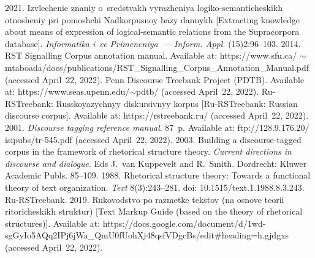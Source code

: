   \begin{multicols}{2}

\renewcommand{\bibname}{\protect\rmfamily References}

{\small\frenchspacing
 {\baselineskip=10.6pt
 

 \begin{thebibliography}{99}
 
  \vspace*{-2pt}
  
 2021. Izvlechenie znaniy o~sredstvakh 
vyrazheniya logiko-semanticheskikh otnosheniy pri pomoshchi Nadkorpusnoy bazy 
dannykh [Extracting knowledge about means of expression of logical-semantic relations 
from the Supracorpora database]. \textit{Informatika i~ee Primeneniya~--- Inform. 
Appl.} (15)2:96--103.
 2014. RST Signalling Corpus annotation manual. 
Available at: {\sf https://www.sfu.ca/ $\sim$mtaboada/docs/publications/RST\_Signalling\_\linebreak Corpus\_Annotation\_Manual.pdf} 
(accessed April~22, 2022).
Penn Discourse Treebank Project (PDTB). Available at: {\sf  
https://www.seas.upenn.edu/$\sim$pdtb/} (accessed April~22, 2022).
Ru-RSTreebank: Russkoyazychnyy diskursivnyy korpus [Ru-RSTreebank: Russian 
discourse corpus]. Available at: {\sf https://rstreebank.ru/} (accessed April~22, 2022).
 2001. \textit{Discourse tagging reference manual}. 
87~p. Available at: {\sf ftp://128.9.176.20/ isipubs/tr-545.pdf} (accessed April~22, 
2022).
 2003. Building a discourse-tagged 
corpus in the framework of rhetorical structure theory. \textit{Current directions in 
discourse and dialogue}. Eds J.~van Kuppevelt and R.~Smith. Dordrecht: Kluwer 
Academic Publs. 85--109.
 1988. Rhetorical structure theory: Towards 
a functional theory of text organization. \textit{Text} 8(3):243--281. doi: 10.1515/text.1.1988.8.3.243.
Ru-RSTreebank. 2019.
Rukovodstvo po razmetke tekstov (na osnove teorii ritoricheskikh struktur) [Text 
Markup Guide (based on the theory of rhetorical structures)]. Available at: {\sf 
https://docs.google.com/\linebreak document/d/1wd-sgGyIo5AQq2IPj6jWa\_QmU0fUohXj\linebreak 48qsfVDgcBs/edit\#heading=h.gjdgxs} (accessed April~22, 2022).

\end{thebibliography}}}
\end{multicols}
